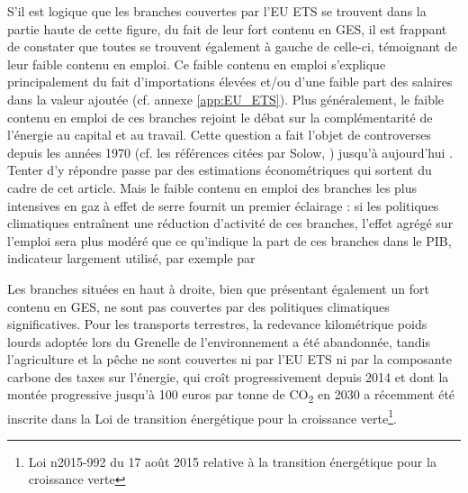 S’il est logique que les branches couvertes par l'EU ETS se trouvent dans la partie haute de cette figure, du fait de leur fort contenu en GES, il est frappant de constater que toutes se trouvent également à gauche de celle-ci, témoignant de leur faible contenu en emploi. Ce faible contenu en emploi s'explique principalement du fait d'importations élevées et/ou d'une faible part des salaires dans la valeur ajoutée (cf. annexe \ref{app:EU_ETS}).
Plus généralement, le faible contenu en emploi de ces branches rejoint le débat sur la complémentarité de l’énergie au capital et au travail. Cette question a fait l’objet de controverses depuis les années 1970 (cf. les références citées par Solow, \citeyear{Solow1987}) jusqu’à aujourd’hui \citep{Dissou2015, Fiorito2016}. 
Tenter d’y répondre passe par des estimations économétriques qui sortent du cadre de cet article. Mais le faible contenu en emploi des branches les plus intensives en gaz à effet de serre fournit un premier éclairage : si les politiques climatiques entraînent une réduction d’activité de ces branches, l’effet agrégé sur l’emploi sera plus modéré que ce qu’indique la part de ces branches dans le PIB, indicateur largement utilisé, par exemple par \citet{Sato2015}

Les branches situées en haut à droite, bien que présentant également un fort contenu en GES, ne sont pas couvertes par des politiques climatiques significatives. Pour les transports terrestres, la redevance kilométrique poids lourds adoptée lors du Grenelle de l’environnement a été abandonnée, tandis l’agriculture et la pêche ne sont couvertes ni par l'EU ETS ni par la composante carbone des taxes sur l’énergie, qui croît progressivement depuis 2014 et dont la montée progressive jusqu’à 100 euros par tonne de CO\textsubscript{2} en 2030 a récemment été inscrite dans la Loi de transition énergétique pour la croissance verte\footnote{Loi n2015-992 du 17 août 2015 relative à la transition énergétique pour la croissance verte}.

